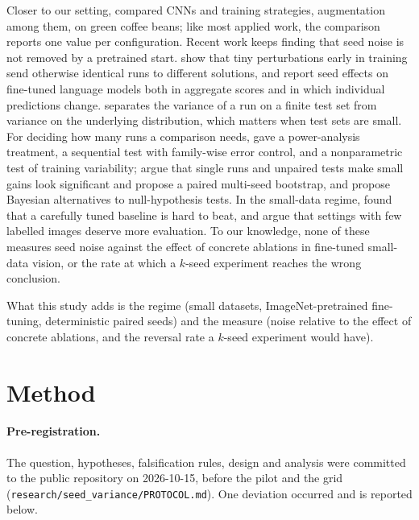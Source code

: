 \documentclass[10pt]{article}
\begin{document}
Closer to our setting, \citet{pereiraneto2023coffee} compared CNNs and training
strategies, augmentation among them, on green coffee beans; like most applied
work, the comparison reports one value per configuration.
Recent work keeps finding that seed noise is not removed by a pretrained start.
\citet{altintas2025butterfly} show that tiny perturbations early in training send
otherwise identical runs to different solutions, and \citet{bui2025seeds} report
seed effects on fine-tuned language models both in aggregate scores and in
which individual predictions change. \citet{jordan2023variance} separates the
variance of a run on a finite test set from variance on the underlying
distribution, which matters when test sets are small. For deciding how many
runs a comparison needs, \citet{colas2018seeds} gave a power-analysis
treatment, \citet{mathieu2024adastop} a sequential test with family-wise error
control, and \citet{banerjee2024training} a nonparametric test of training
variability; \citet{du2025pairedbootstrap} argue that single runs and unpaired
tests make small gains look significant and propose a paired multi-seed
bootstrap, and \citet{benavoli2017time} propose Bayesian alternatives to
null-hypothesis tests. In the small-data regime, \citet{brigato2021tune} found
that a carefully tuned baseline is hard to beat, and \citet{stevens2025datagap}
argue that settings with few labelled images deserve more evaluation. To our
knowledge, none of these measures seed noise against the effect of concrete
ablations in fine-tuned small-data vision, or the rate at which a $k$-seed
experiment reaches the wrong conclusion.

What this study adds is the regime (small datasets, ImageNet-pretrained
fine-tuning, deterministic paired seeds) and the measure (noise relative to
the effect of concrete ablations, and the reversal rate a $k$-seed experiment
would have).

\section{Method}\label{sec:method}

\paragraph{Pre-registration.} The question, hypotheses, falsification rules,
design and analysis were committed to the public repository on 2026-10-15,
before the pilot and the grid (\texttt{research/seed\_variance/PROTOCOL.md}).
One deviation occurred and is reported below.
\end{document}

